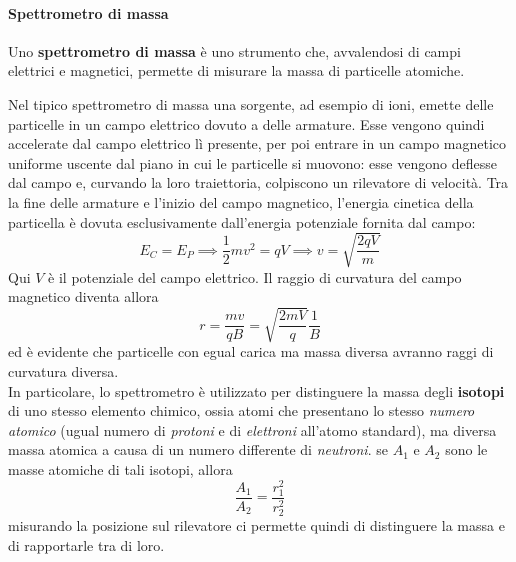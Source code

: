 \paragraph{Spettrometro di massa}
\begin{define}
	Uno \textbf{spettrometro di massa} è uno strumento che, avvalendosi di campi elettrici e magnetici, permette di misurare la massa di particelle atomiche.
\end{define}
Nel tipico spettrometro di massa una sorgente, ad esempio di ioni, emette delle particelle in un campo elettrico dovuto a delle armature. Esse vengono quindi accelerate dal campo elettrico lì presente, per poi entrare in un campo magnetico uniforme uscente dal piano in cui le particelle si muovono: esse vengono deflesse dal campo e, curvando la loro traiettoria, colpiscono un rilevatore di velocità.
Tra la fine delle armature e l'inizio del campo magnetico, l'energia cinetica della particella è dovuta esclusivamente dall'energia potenziale fornita dal campo:
\begin{equation*}
	E_C=E_P\implies \frac{1}{2}mv^2=qV\implies v=\sqrt{\frac{2qV}{m}}
\end{equation*}
Qui $V$ è il potenziale del campo elettrico. Il raggio di curvatura del campo magnetico diventa allora
\begin{equation*}
	r=\frac{mv}{qB}=\sqrt{\frac{2mV}{q}}\frac{1}{B}
\end{equation*}
ed è evidente che particelle con egual carica ma massa diversa avranno raggi di curvatura diversa.\\
In particolare, lo spettrometro è utilizzato per distinguere la massa degli \textbf{isotopi} di uno stesso elemento chimico, ossia atomi che presentano lo stesso \textit{numero atomico} (ugual numero di \textit{protoni} e di \textit{elettroni} all'atomo standard), ma diversa massa atomica a causa di un numero differente di \textit{neutroni}.
se $A_1$ e $A_2$ sono le masse atomiche di tali isotopi, allora
\begin{equation*}
	\frac{A_1}{A_2}=\frac{r_1^2}{r_2^2}
\end{equation*}
misurando la posizione sul rilevatore ci permette quindi di distinguere la massa e di rapportarle tra di loro.

